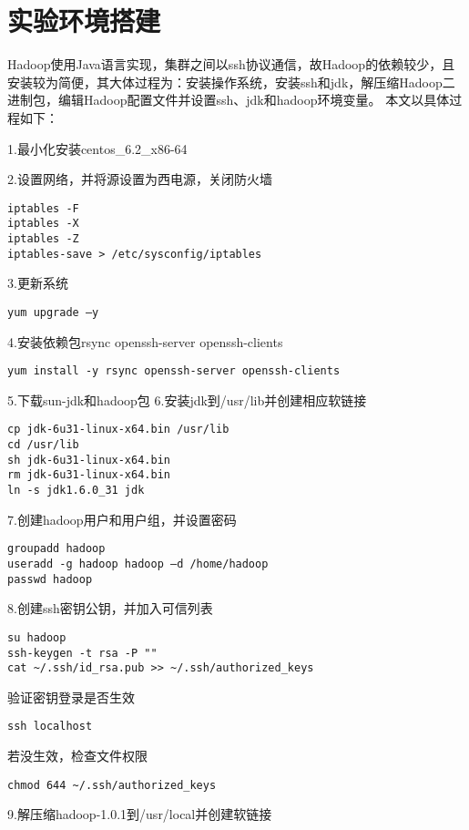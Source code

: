 \chapter[实验环境搭建]{实验环境搭建}
\label{chap:fuluA}
Hadoop使用Java语言实现，集群之间以ssh协议通信，故Hadoop的依赖较少，且安装较为简便，其大体过程为：安装操作系统，安装ssh和jdk，解压缩Hadoop二进制包，编辑Hadoop配置文件并设置ssh、jdk和hadoop环境变量。
本文以具体过程如下：

1.最小化安装centos\_6.2\_x86-64

2.设置网络，并将源设置为西电源，关闭防火墙

\begin{verbatim}
iptables -F
iptables -X
iptables -Z
iptables-save > /etc/sysconfig/iptables
\end{verbatim}
3.更新系统

\begin{verbatim}
yum upgrade –y
\end{verbatim}
4.安装依赖包rsync openssh-server openssh-clients

\begin{verbatim}
yum install -y rsync openssh-server openssh-clients
\end{verbatim}
5.下载sun-jdk和hadoop包
6.安装jdk到/usr/lib并创建相应软链接

\begin{verbatim}
cp jdk-6u31-linux-x64.bin /usr/lib
cd /usr/lib
sh jdk-6u31-linux-x64.bin
rm jdk-6u31-linux-x64.bin
ln -s jdk1.6.0_31 jdk
\end{verbatim}
7.创建hadoop用户和用户组，并设置密码

\begin{verbatim}
groupadd hadoop
useradd -g hadoop hadoop –d /home/hadoop
passwd hadoop
\end{verbatim}
8.创建ssh密钥公钥，并加入可信列表

\begin{verbatim}
su hadoop
ssh-keygen -t rsa -P ""
cat ~/.ssh/id_rsa.pub >> ~/.ssh/authorized_keys
\end{verbatim}
验证密钥登录是否生效

\begin{verbatim}
ssh localhost
\end{verbatim}
若没生效，检查文件权限

\begin{verbatim}
chmod 644 ~/.ssh/authorized_keys
\end{verbatim}
9.解压缩hadoop-1.0.1到/usr/local并创建软链接

